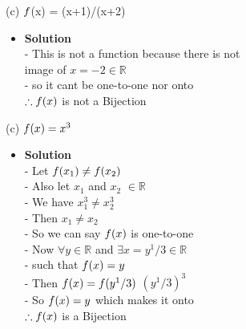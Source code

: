 \documentclass[11pt]{article}
\begin{document}
\begin{enumerate}
\begin{flushleft}
\end{flushleft}

\large (c) $\mathnormal{f}$(x) = (x+1)/(x+2)\\

\begin{itemize}
\item \textbf{Solution}\\
\large - This is not a function because there is not \\
\large image of $x = -2 \in \mathbb{R}$\\
\large - so it cant be one-to-one nor onto\\
\large $\therefore \mathnormal{f} (x)$ is not a Bijection\\


\end {itemize}
\end {enumerate}


\begin{enumerate}
\begin{flushleft}
\end{flushleft}


\large (c) $\mathnormal{f}(x) = x^3$\\

\begin{itemize}
\item \textbf{Solution}\\
\large - Let $\mathnormal{f}(x_1) \neq \mathnormal{f}(x_2)$\\
\large - Also let $x_1$ and $x_2$ $\in \mathbb{R}$\\
\large - We have $x_1^3 \neq x_2^3$\\
\large - Then $x_1 \neq x_2$\\
\large - So we can say $\mathnormal{f}(x)$ is one-to-one\\
\large - Now $\forall y \in \mathbb{R}$ and $\exists x = y^1/3 \in \mathbb{R}$ \\
\large - such that $\mathnormal{f}(x) = y$\\
\large - Then $\mathnormal{f}(x) = \mathnormal{f}(y^1/3)$ \longrightarrow $(y^1/3)^3$\\
\large - So $\mathnormal{f}(x) = y$ which makes it onto\\
\large $\therefore \mathnormal{f}(x)$ is a Bijection\\


\end {itemize}
\end {enumerate}
\end{document}
